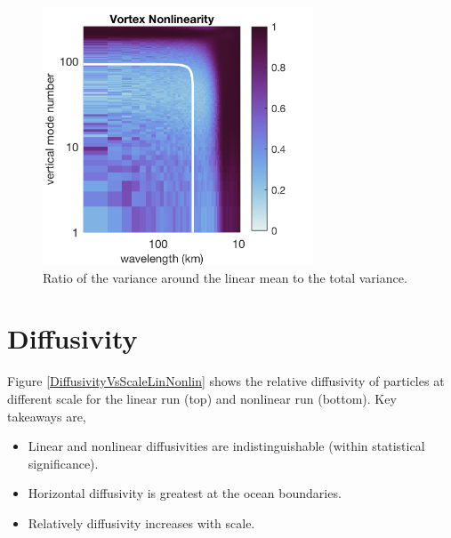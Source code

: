 \documentclass[10pt]{article}
\begin{document}
\begin{figure}[t]
  \centerline{\includegraphics[width=19pc,angle=0]{figures/VortexNonlinearity}}
  \caption{Ratio of the variance around the linear mean to the total variance.}
  \label{VortexNonlinearity}
\end{figure}

%
\section{Diffusivity}
%

Figure \ref{DiffusivityVsScaleLinNonlin} shows the relative diffusivity of particles at different scale for the linear run (top) and nonlinear run (bottom). Key takeaways are,
\begin{itemize}
    \item Linear and nonlinear diffusivities are indistinguishable (within statistical significance).
    \item Horizontal diffusivity is greatest at the ocean boundaries.
    \item Relatively diffusivity increases with scale.
\end{itemize}
\end{document}
